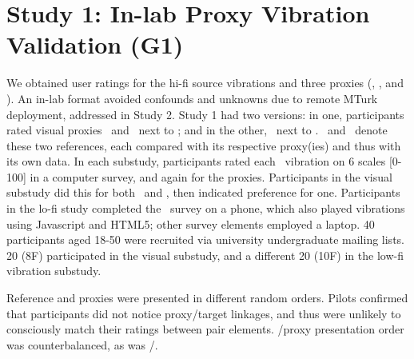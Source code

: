 

\hspace{0.2in}
\section{Study 1: In-lab Proxy Vibration Validation (G1)} 
%
We obtained user ratings for the hi-fi source vibrations \hifi and three proxies (\original, \linear, and \lofi). An in-lab format avoided confounds and unknowns due to remote MTurk deployment, addressed in Study 2.
Study 1 had two versions: in one, participants rated visual proxies \original\ and \linear~next to \hifi; and in the other, \lofi\ next to \hifi.
%
\visref\ and \lofiref\ denote these two references, each compared  with its respective proxy(ies) and thus with its own data. 
In each substudy, participants rated each \hifi\ vibration on 6 scales [0-100] in a computer survey, and again for the proxies.
Participants in the visual substudy did this for both \original~and \linear, then indicated preference for one.
Participants in the lo-fi  study completed the \lofi~survey on a phone, which also played vibrations using Javascript and HTML5; other survey elements  employed a laptop.
40 participants aged 18-50 were recruited via university undergraduate mailing lists.
20 (8F) participated in the visual substudy, and a different 20 (10F) in the low-fi vibration substudy.

Reference and proxies were presented in different random orders.
Pilots confirmed that  participants did not notice proxy/target linkages, and thus were unlikely to consciously match their ratings between pair elements. %
\hifi/proxy presentation order was counterbalanced, as was \original/\linear.




